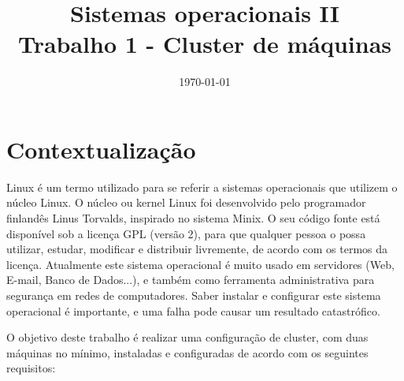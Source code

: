 \documentclass[
	12pt,				%
	openany,			%
	a4paper,			%
	chapter=TITLE,		%
	section=TITLE,		%
	english,
	brazil				%
]{abntex2}
\title{Sistemas operacionais II \\ Trabalho 1 - Cluster de máquinas}
\date{\today}
\begin{document}
\maketitle

\chapter{Contextualização}

Linux é um termo utilizado para se referir a sistemas operacionais que utilizem o núcleo Linux. O núcleo ou kernel Linux foi desenvolvido pelo programador finlandês Linus Torvalds, inspirado no sistema Minix. O seu código fonte está disponível sob a licença GPL (versão 2), para que qualquer pessoa o possa utilizar, estudar, modificar e distribuir livremente, de acordo com os termos da licença. Atualmente este sistema operacional é muito usado em servidores (Web, E-mail, Banco de Dados...), e também como ferramenta administrativa para segurança em redes de computadores. Saber instalar e configurar este sistema operacional é importante, e uma falha pode causar um resultado catastrófico.

O objetivo deste trabalho é realizar uma configuração de cluster, com duas máquinas no mínimo, instaladas e configuradas de acordo com os seguintes requisitos:
\end{document}

